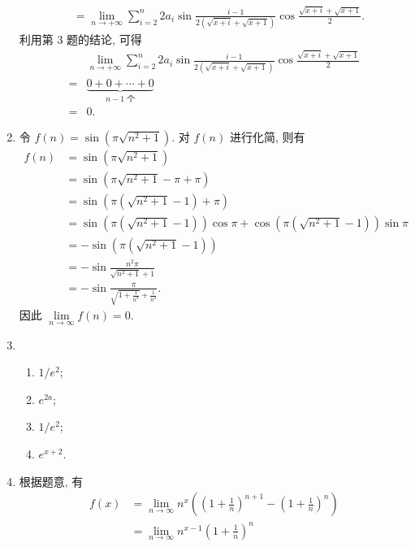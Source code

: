 \begin{enumerate}
\begin{align*}
                                                             &= \lim_{n\to+\infty}\sum_{i=2}^n 2a_i\sin\frac{i-1}{2(\sqrt{x+i} + \sqrt{x+1})}\cos\frac{\sqrt{x+i} + \sqrt{x+1}}{2}.
        \end{align*}
        利用第 3 题的结论, 可得
        \begin{align*}
                & \lim_{n\to+\infty}\sum_{i=2}^n 2a_i\sin\frac{i-1}{2(\sqrt{x+i} + \sqrt{x+1})}\cos\frac{\sqrt{x+i} + \sqrt{x+1}}{2} \\
            ={} & \underbrace{0 + 0 + \cdots + 0}_{\text{$n-1$ 个}} \\
            ={} & 0.
        \end{align*}
    \item %
        令 $f(n) = \sin(\pi\sqrt{n^2+1})$. 对 $f(n)$ 进行化简, 则有
        \begin{align*}
            f(n) &= \sin(\pi\sqrt{n^2+1}) \\
                 &= \sin(\pi\sqrt{n^2+1} - \pi + \pi) \\
                 &= \sin\left(\pi(\sqrt{n^2+1} - 1) + \pi\right) \\
                 &= \sin\left(\pi(\sqrt{n^2+1} - 1)\right)\cos\pi + \cos\left(\pi(\sqrt{n^2+1} - 1)\right)\sin\pi \\
                 &= -\sin\left(\pi(\sqrt{n^2+1} - 1)\right) \\
                 &= -\sin\frac{n^2\pi}{\sqrt{n^2+1} + 1} \\
                 &= -\sin\frac{\pi}{\sqrt{1+\frac{1}{n^2}} + \frac{1}{n^2}}.
        \end{align*}
        因此 $\lim\limits_{n\to\infty}f(n) = 0$.
    \item %
        \begin{enumerate}[(1)]
            \item %
                $1/e^2$;
            \item %
                $e^{2a}$;
            \item %
                $1/e^2$;
            \item %
                $e^{x+2}$.
        \end{enumerate}
    \item %
        根据题意, 有
        \begin{align*}
            f(x) &= \lim_{n\to\infty}n^x\left(\left(1+\frac1n\right)^{n+1} - \left(1+\frac1n\right)^n\right) \\
                 &= \lim_{n\to\infty} n^{x-1} \left(1+\frac1n\right)^n \\

\end{align*}
\end{enumerate}
